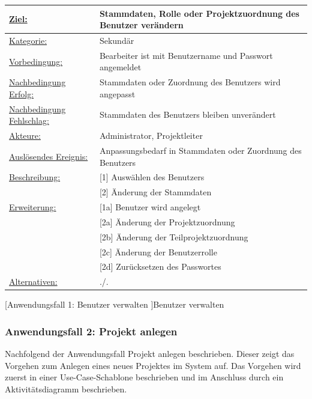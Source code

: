 \label{tab:UC1}
\begin{tabularx}{\textwidth}{|p{}|p{}|}
        \hline
        \underline{Ziel:} & Stammdaten, Rolle oder Projektzuordnung des Benutzer verändern \\\hline
        \underline{Kategorie:} & Sekundär \\\hline
        \underline{Vorbedingung:} & Bearbeiter ist mit Benutzername und Passwort angemeldet \\\hline
        \underline{Nachbedingung Erfolg:} & Stammdaten oder Zuordnung des Benutzers wird angepasst \\\hline
        \underline{Nachbedingung Fehlschlag:} & Stammdaten des Benutzers bleiben unverändert \\\hline
        \underline{Akteure:} & Administrator, Projektleiter \\\hline
        \underline{Auslösendes Ereignis:} & Anpassungsbedarf in Stammdaten oder Zuordnung des Benutzers\\\hline        
        \multirow{1}{*}{\underline{Beschreibung:}} & [1] Auswählen des Benutzers \\
        & [2] Änderung der Stammdaten \\\hline
        \multirow{1}{*}{\underline{Erweiterung:}} & [1a] Benutzer wird angelegt \\
        & [2a] Änderung der Projektzuordnung \\
        & [2b] Änderung der Teilprojektzuordnung \\
        & [2c] Änderung der Benutzerrolle \\
        & [2d] Zurücksetzen des Passwortes \\\hline
        \underline{Alternativen:} & ./. \\\hline
\end{tabularx}
[Anwendungsfall 1: Benutzer verwalten ]{Benutzer verwalten}

\newpage
\subsubsection{Anwendungsfall 2: Projekt anlegen}
Nachfolgend der Anwendungsfall \glqq{}Projekt anlegen\grqq{} beschrieben. Dieser zeigt das Vorgehen zum Anlegen eines neues Projektes im System auf. Das Vorgehen wird zuerst in einer Use-Case-Schablone beschrieben und im Anschluss durch ein Aktivitätsdiagramm beschrieben.\\

